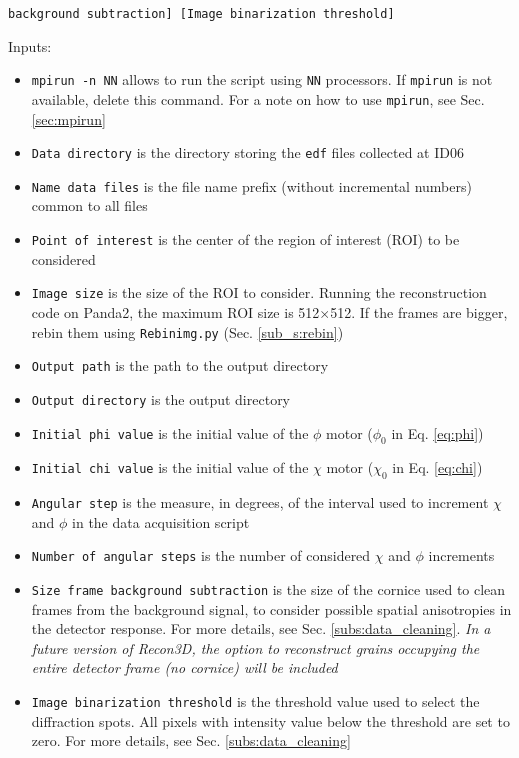 \documentclass[11pt]{scrartcl}
\begin{document}
{\texttt{background subtraction] [Image binarization threshold]}}

Inputs:

\begin{itemize}
    \item {\texttt{mpirun -n NN}} allows to run the script using {\texttt{NN}} processors. If {\texttt{mpirun}} is not available, delete this command. For a note on how to use {\texttt{mpirun}}, see Sec. \ref{sec:mpirun} 
    \item {\texttt{Data directory}} is the directory storing the {\texttt{edf}} files collected at {\footnotesize{ID06}}
    \item {\texttt{Name data files}} is the file name prefix (without incremental numbers) common to all files
    \item {\texttt{Point of interest}} is the center of the region of interest ({\footnotesize{ROI}}) to be considered
    \item {\texttt{Image size}} is the size of the {\footnotesize{ROI}} to consider. Running the reconstruction code on Panda2, the maximum {\footnotesize{ROI}} size is 512$\times$512. If the frames are bigger, rebin them using {\texttt{Rebin\textunderscore img.py}} (Sec. \ref{sub_s:rebin})
    \item {\texttt{Output path}} is the path to the output directory
    \item {\texttt{Output directory}} is the output directory
    \item {\texttt{Initial phi value}} is the initial value of the $\phi$ motor ($\phi_0$ in Eq. \ref{eq:phi})
    \item {\texttt{Initial chi value}} is the initial value of the $\chi$ motor ($\chi_0$ in Eq. \ref{eq:chi})
    \item {\texttt{Angular step}} is the measure, in degrees, of the interval used to increment $\chi$ and $\phi$ in the data acquisition script
    \item {\texttt{Number of angular steps}} is the number of considered $\chi$ and $\phi$ increments
    \item {\texttt{Size frame background subtraction}} is the size of the cornice used to clean frames from the background signal, to consider possible spatial anisotropies in the detector response. For more details, see Sec. {\ref{subs:data_cleaning}}. {\textit{In a future version of Recon3D, the option to reconstruct grains occupying the entire detector frame (no cornice) will be included}}
    \item {\texttt{Image binarization threshold}} is the threshold value used to select the diffraction spots. All pixels with intensity value below the threshold are set to zero. For more details, see Sec. {\ref{subs:data_cleaning}}
\end{itemize}
\end{document}
